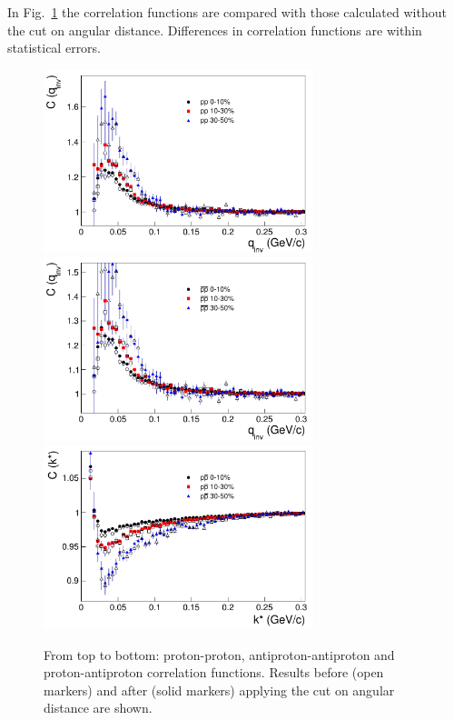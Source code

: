 In Fig.~\ref{cfsyst} the correlation functions are compared with those calculated without the cut on angular distance. %
Differences in correlation functions are within statistical errors.
\begin{figure}%
  \centering
  \includegraphics[width=0.7\textwidth]{cfPPsyst}
  \includegraphics[width=0.7\textwidth]{cfAPAPsyst}
  \includegraphics[width=0.7\textwidth]{cfPAPsyst}
  \caption{From top to bottom: proton-proton, antiproton-antiproton and proton-antiproton correlation functions. Results before (open markers) and after (solid markers) applying the cut on angular distance are shown.}
  \label{cfsyst}
\end{figure}


